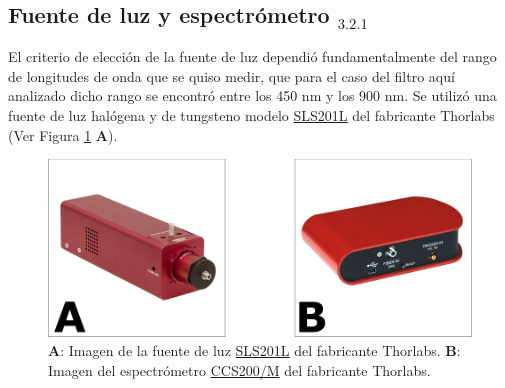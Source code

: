 
\singlespacing
\subsection{Fuente de luz y espectrómetro \href{https://github.com/jrr1984/defects_analysis/blob/master/light_sources_spectrum.py}{\faGithub$_{3.2.1}$}}
\label{sec:fteluzyesp}

\hspace{0.5cm}El criterio de elección de la fuente de luz dependió fundamentalmente del rango de longitudes de onda que se quiso medir, que para el caso del filtro aquí analizado dicho rango se encontró entre los 450 nm y los 900 nm.
Se utilizó una fuente de luz halógena y de tungsteno modelo \href{https://www.thorlabs.com/newgrouppage9.cfm?objectgroup_id=7269&pn=SLS201L/M}{SLS201L} del fabricante Thorlabs (Ver Figura \ref{fig:fuentesp} \textbf{A}). 

\begin{figure}[H]
\centering
\includegraphics[scale=0.3]{Figs/microespectrometro/luzespectrommm.png}
\caption{\textbf{A}: Imagen de la fuente de luz \href{https://www.thorlabs.com/newgrouppage9.cfm?objectgroup\_id=7269\&pn=SLS201L/M}{SLS201L} del fabricante Thorlabs. \textbf{B}: Imagen del espectrómetro \href{https://www.thorlabs.com/thorproduct.cfm?partnumber=CCS200/M\#ad-image-0}{CCS200/M} del fabricante Thorlabs.}
\label{fig:fuentesp}		
\end{figure}

